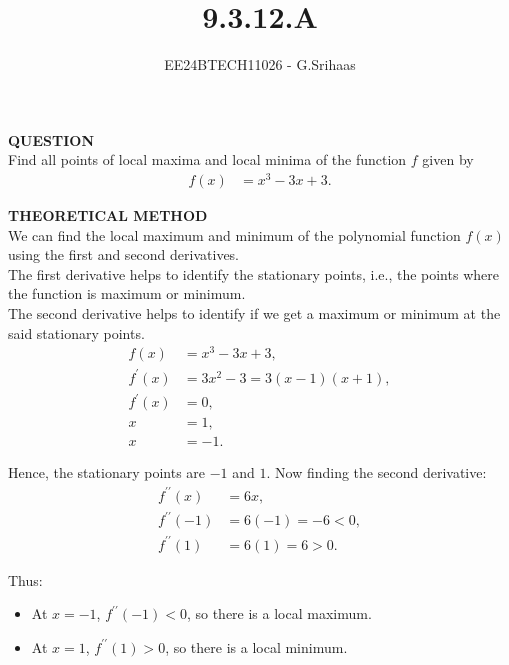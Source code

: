 \documentclass[journal]{IEEEtran}
\begin{document}

\vspace{3cm}

\title{9.3.12.A}
\author{EE24BTECH11026 - G.Srihaas}
{\let\newpage\relax\maketitle}

\renewcommand{\thefigure}{\theenumi}
\renewcommand{\thetable}{\theenumi}
\setlength{\intextsep}{10pt} %

\renewcommand{\thetable}{\theenumi}

\textbf{QUESTION} \\
Find all points of local maxima and local minima of the function $f$ given by
\begin{align}
f(x) &= x^3 - 3x + 3.
\end{align}

\solution
\textbf{THEORETICAL METHOD} \\
We can find the local maximum and minimum of the polynomial function $f(x)$ using the first and second derivatives. \\
The first derivative helps to identify the stationary points, i.e., the points where the function is maximum or minimum. \\
The second derivative helps to identify if we get a maximum or minimum at the said stationary points. \\

\begin{align}
f(x) &= x^3 - 3x + 3, \\
f^{\prime}(x) &= 3x^2 - 3 = 3(x - 1)(x + 1), \\
f^{\prime}(x) &= 0, \\
x &= 1, \\
x &= -1.
\end{align}

Hence, the stationary points are $-1$ and $1$. Now finding the second derivative: \\
\begin{align}
f^{\prime\prime}(x) &= 6x, \\
f^{\prime\prime}(-1) &= 6(-1) = -6 < 0, \\
f^{\prime\prime}(1) &= 6(1) = 6 > 0.
\end{align}

Thus:
\begin{itemize}
    \item At $x = -1$, $f^{\prime\prime}(-1) < 0$, so there is a local maximum.
    \item At $x = 1$, $f^{\prime\prime}(1) > 0$, so there is a local minimum.
\end{itemize}
\end{document}
